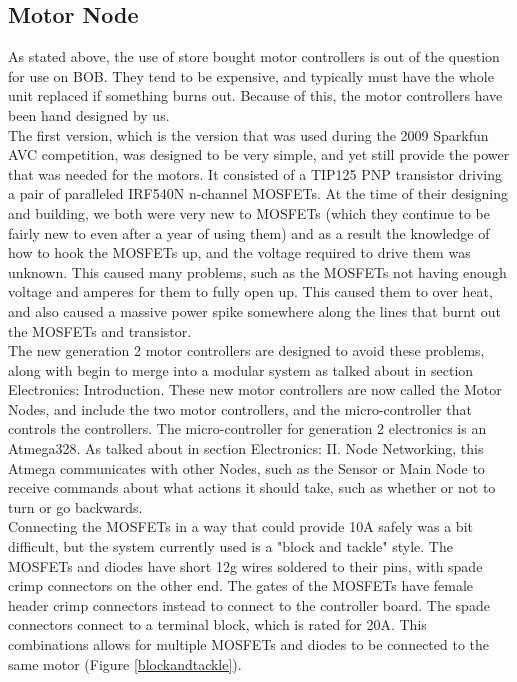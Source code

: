 \documentclass{article}
\begin{document}
\subsection{Motor Node}
As stated above, the use of store bought motor controllers is out of the question for use on BOB. They tend to be expensive, and typically must have the whole unit replaced if something burns out. Because of this, the motor controllers have been hand designed by us.\\
The first version, which is the version that was used during the 2009 Sparkfun AVC competition, was designed to be very simple, and yet still provide the power that was needed for the motors. It consisted of a TIP125 PNP transistor driving a pair of paralleled IRF540N n-channel MOSFETs. At the time of their designing and building, we both were very new to MOSFETs (which they continue to be fairly new to even after a year of using them) and as a result the knowledge of how to hook the MOSFETs up, and the voltage required to drive them was unknown. This caused many problems, such as the MOSFETs not having enough voltage and amperes for them to fully open up. This caused them to over heat, and also caused a massive power spike somewhere along the lines that burnt out the MOSFETs and transistor.\\
The new generation 2 motor controllers are designed to avoid these problems, along with begin to merge into a modular system as talked about in section Electronics: Introduction. These new motor controllers are now called the Motor Nodes, and include the two motor controllers, and the micro-controller that controls the controllers. The micro-controller for generation 2 electronics is an Atmega328. As talked about in section Electronics: II. Node Networking, this Atmega communicates with other Nodes, such as the Sensor or Main Node to receive commands about what actions it should take, such as whether or not to turn or go backwards.\\
Connecting the MOSFETs in a way that could provide 10A safely was a bit difficult, but the system currently used is a "block and tackle" style. The MOSFETs and diodes have short 12g wires soldered to their pins, with spade crimp connectors on the other end. The gates of the MOSFETs have female header crimp connectors instead to connect to the controller board. The spade connectors connect to a  terminal block, which is rated for 20A. This combinations allows for multiple MOSFETs and diodes to be connected to the same motor (Figure \ref{blockandtackle}).
\end{document}
